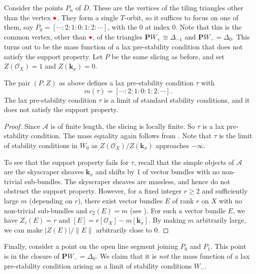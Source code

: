 \documentclass{amsart}
\begin{document}
Consider the points \(P_n\) of \(\overline D\).
These are the vertices of the tiling triangles other than the vertex \(\textcolor{red}{\bullet}\).
They form a single \(T\)-orbit, so it suffices to focus on one of them, say \(P_0 = [\cdots : 2:1:0:1:2: \cdots]\), with the \(0\) at index \(0\).
Note that this is the common vertex, other than \(\textcolor{red}{\bullet}\), of the triangles \(\mathbf{P}W_{+} \cong \Delta_{-1}\) and \(\mathbf{P}W_- = \Delta_0\).
This turns out to be the mass function of a lax pre-stability condition that does not satisfy the support property.
Let \(P\) be the same slicing as before, and set \(Z(\mathcal{O}_X) = 1\) and \(Z(\mathbf{k}_x) = 0\).
\begin{proposition}\label{prop:v0}
  The pair \((P,Z)\) as above defines a lax pre-stability condition \(\tau\) with
\[m(\tau) = [\cdots : 2: 1 : 0: 1 : 2: \cdots].\]
  The lax pre-stability condition \(\tau\) is a limit of standard stability conditions, and it does not satisfy the support property.
\end{proposition}
\begin{proof}
  Since \(\mathcal{A}\) is of finite length, the slicing is locally finite.
  So \(\tau\) is a lax pre-stability condition.
  The mass equality again follows from .
  Note that \(\tau\) is the limit of stability conditions in \(W_0\) as \(Z(\mathcal{O}_X)/Z(\mathbf{k}_x)\) approaches \(-\infty\).

  To see that the support property fails for \(\tau\), recall that the simple objects of \(\mathcal{A}\) are the skyscraper sheaves \(\mathbf{k}_x\) and shifts by 1 of vector bundles with no non-trivial sub-bundles.
  The skyscraper sheaves are massless, and hence do not obstruct the support property.
  However, for a fixed integer \(r \geq 2\) and sufficiently large \(m\) (depending on \(r\)), there exist vector bundles \(E\) of rank \(r\) on \(X\) with no non-trivial sub-bundles and \(c_2(E) = m\) (see \cite[Th\'eor\`eme~5.3]{ban.le-pot:87}).
  For such a vector bundle \(E\), we have \(Z_{\tau}(E) = r\) and \([E] = r [\mathcal{O}_X] - m [\mathbf{k}_x]\).
  By making \(m\) arbitrarily large, we can make \(|Z(E)|/\|E\|\) arbitrarily close to \(0\).
\end{proof}


Finally, consider a point on the open line segment joining \(P_{0}\) and \(P_{1}\).
This point is in the closure of \(\mathbf{P}W_- = \Delta_0\).
We claim that it is \emph{not} the mass function of a lax pre-stability condition arising as a limit of stability conditions \(W_-\).
\end{document}
